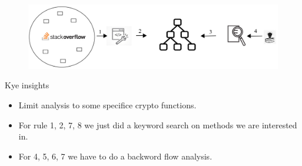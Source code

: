 \begin{figure}[t]
  \centering
  \includegraphics*[width=\linewidth]{Figures/overall-process.png}
  \caption{}
\end{figure}

Kye insights
\begin{itemize}
  \item Limit analysis to some specifice crypto functions.
  \item For rule 1, 2, 7, 8 we just did a keyword search on methods we are interested in.
  \item For 4, 5, 6, 7 we have to do a backword flow analysis. 
\end{itemize}
\iffalse
